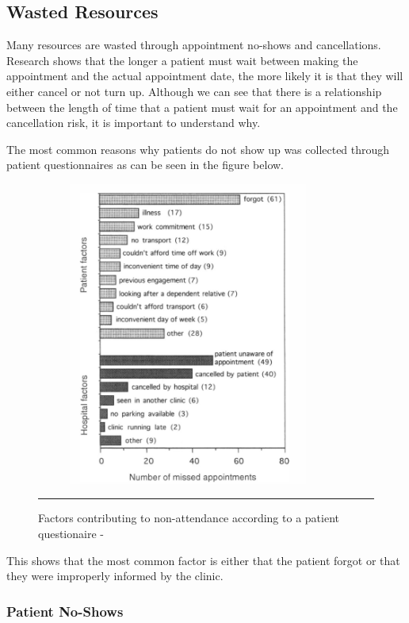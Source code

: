 \subsection{Wasted Resources}

Many resources are wasted through appointment no-shows and cancellations. Research shows that the longer a patient must wait between making the appointment and the actual appointment date, the more likely it is that they will either cancel or not turn up\cite{Gallucci}. Although we can see that there is a relationship between the length of time that a patient must wait for an appointment and the cancellation risk, it is important to understand why.

The most common reasons why patients do not show up was collected through patient questionnaires as can be seen in the figure below.

\begin{figure}[htbp]
	\centering
		\includegraphics[width=10cm,height=10cm,keepaspectratio]{Figures/MissedAppointmentsStoneEtAl.png}
		\rule{35em}{0.5pt}
	\caption[Factors contributing to non-attendance according to a patient questionaire - \cite{Stone}]{Factors contributing to non-attendance according to a patient questionaire - \cite{Stone}}
	\label{fig:NonAttendance}
\end{figure}

This shows that the most common factor is either that the patient forgot or that they were improperly informed by the clinic.

\subsubsection{Patient No-Shows}

